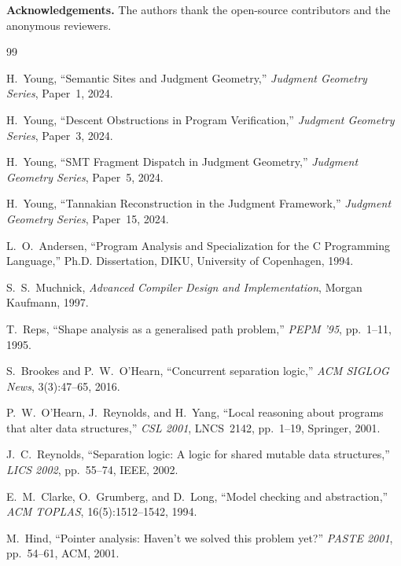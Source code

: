 \documentclass[11pt]{article}
\begin{document}
\bigskip
\noindent\textbf{Acknowledgements.}
The authors thank the \JuGeo{} open-source contributors and the
anonymous reviewers.

\begin{thebibliography}{99}

H.~Young, ``Semantic Sites and Judgment Geometry,''
\emph{Judgment Geometry Series}, Paper~1, 2024.

H.~Young, ``Descent Obstructions in Program Verification,''
\emph{Judgment Geometry Series}, Paper~3, 2024.

H.~Young, ``SMT Fragment Dispatch in Judgment Geometry,''
\emph{Judgment Geometry Series}, Paper~5, 2024.

H.~Young, ``Tannakian Reconstruction in the Judgment Framework,''
\emph{Judgment Geometry Series}, Paper~15, 2024.

L.~O.~Andersen,
``Program Analysis and Specialization for the C Programming Language,''
Ph.D. Dissertation, DIKU, University of Copenhagen, 1994.

S.~S.~Muchnick,
\emph{Advanced Compiler Design and Implementation},
Morgan Kaufmann, 1997.

T.~Reps, ``Shape analysis as a generalised path problem,''
\emph{PEPM '95}, pp.\ 1--11, 1995.

S.~Brookes and P.~W.~O'Hearn,
``Concurrent separation logic,''
\emph{ACM SIGLOG News}, 3(3):47--65, 2016.

P.~W.~O'Hearn, J.~Reynolds, and H.~Yang,
``Local reasoning about programs that alter data structures,''
\emph{CSL 2001}, LNCS~2142, pp.\ 1--19, Springer, 2001.

J.~C.~Reynolds,
``Separation logic: A logic for shared mutable data structures,''
\emph{LICS 2002}, pp.\ 55--74, IEEE, 2002.

E.~M.~Clarke, O.~Grumberg, and D.~Long,
``Model checking and abstraction,''
\emph{ACM TOPLAS}, 16(5):1512--1542, 1994.

M.~Hind,
``Pointer analysis: Haven't we solved this problem yet?''
\emph{PASTE 2001}, pp.\ 54--61, ACM, 2001.

\end{thebibliography}
\end{document}
